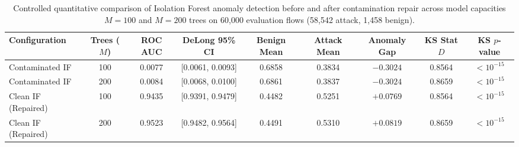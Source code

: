 \documentclass[journal,10pt,onecolumn]{IEEEtran}
\begin{document}
\begin{table}[t]
\caption{Controlled quantitative comparison of Isolation Forest anomaly detection before and after contamination repair across model capacities $M=100$ and $M=200$ trees on 60,000 evaluation flows (58,542 attack, 1,458 benign).}
\label{tab:if_controlled}
\centering
\small
\begin{tabular}{lcccccccc}
\toprule
\textbf{Configuration} & \textbf{Trees ($M$)} & \textbf{ROC AUC} & \textbf{DeLong 95\% CI} & \textbf{Benign Mean} & \textbf{Attack Mean} & \textbf{Anomaly Gap} & \textbf{KS Stat $D$} & \textbf{KS $p$-value} \\
\midrule
Contaminated IF & 100 & 0.0077 & [0.0061, 0.0093] & 0.6858 & 0.3834 & $-0.3024$ & 0.8564 & $< 10^{-15}$ \\
Contaminated IF & 200 & 0.0084 & [0.0068, 0.0100] & 0.6861 & 0.3837 & $-0.3024$ & 0.8659 & $< 10^{-15}$ \\
Clean IF (Repaired) & 100 & 0.9435 & [0.9391, 0.9479] & 0.4482 & 0.5251 & $+0.0769$ & 0.8564 & $< 10^{-15}$ \\
Clean IF (Repaired) & 200 & 0.9523 & [0.9482, 0.9564] & 0.4491 & 0.5310 & $+0.0819$ & 0.8659 & $< 10^{-15}$ \\
\bottomrule
\end{tabular}
\end{table}
\end{document}
